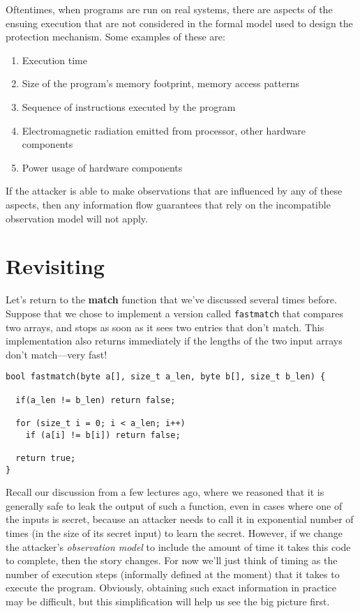 \documentclass[11pt,twoside]{scrartcl}
\begin{document}
Oftentimes, when programs are run on real systems, there are aspects of the ensuing execution that are not considered in the formal model used to design the protection mechanism. Some examples of these are:
\begin{enumerate}
\item Execution time
\item Size of the program's memory footprint, memory access patterns
\item Sequence of instructions executed by the program
\item Electromagnetic radiation emitted from processor, other hardware components
\item Power usage of hardware components
\end{enumerate}
If the attacker is able to make observations that are influenced by any of these aspects, then any information flow guarantees that rely on the incompatible observation model will not apply.

\section{Revisiting }

Let's return to the \textbf{match} function that we've discussed several times before. 
Suppose that we chose to implement a version called \texttt{fastmatch} that compares two arrays, and stops as soon as it sees two entries that don't match.
This implementation also returns immediately if the lengths of the two input arrays don't match---very fast!
\\[-1ex]

\begin{lstlisting}
bool fastmatch(byte a[], size_t a_len, byte b[], size_t b_len) {

  if(a_len != b_len) return false;

  for (size_t i = 0; i < a_len; i++)
    if (a[i] != b[i]) return false;
 
  return true;
}
\end{lstlisting}

Recall our discussion from a few lectures ago, where we reasoned that it is generally safe to leak the output of such a function, even in cases where one of the inputs is secret, because an attacker needs to call it in exponential number of times (in the size of its secret input) to learn the secret.
However, if we change the attacker's \emph{observation model} to include the amount of time it takes this code to complete, then the story changes. For now we'll just think of timing as the number of execution steps (informally defined at the moment) that it takes to execute the program. Obviously, obtaining such exact information in practice may be difficult, but this simplification will help us see the big picture first.
\end{document}
